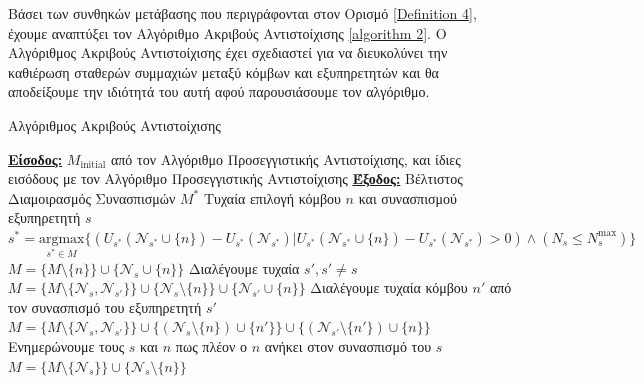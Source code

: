 Βάσει των συνθηκών μετάβασης που περιγράφονται στον Ορισμό \ref{Definition 4}, έχουμε αναπτύξει τον Αλγόριθμο Ακριβούς Αντιστοίχισης \ref{algorithm 2}. Ο Αλγόριθμος Ακριβούς Αντιστοίχισης έχει σχεδιαστεί για να διευκολύνει την καθιέρωση σταθερών συμμαχιών μεταξύ κόμβων και εξυπηρετητών και θα αποδείξουμε την ιδιότητά του αυτή αφού παρουσιάσουμε τον αλγόριθμο.

\begin{algorithm}[h]
\caption{Αλγόριθμος Ακριβούς Αντιστοίχισης} \label{algorithm 2}
\begin{algorithmic}[1]
\STATE \textbf{\underline{Είσοδος:}}
    $M_{\text{initial}}$ από τον Αλγόριθμο Προσεγγιστικής Αντιστοίχισης, και ίδιες εισόδους με τον Αλγόριθμο Προσεγγιστικής Αντιστοίχισης
\STATE \textbf{\underline{Έξοδος:}}
    Βέλτιστος Διαμοιρασμός Συνασπισμών $M^*$
    \REPEAT
        \STATE Τυχαία επιλογή κόμβου $n$ και συνασπισμού εξυπηρετητή $s$
            \STATE $s^* = \underset{s^* \in M}{\text{argmax}} \{ (U_{s^*}(\mathcal{N}_{s^*}\cup\{n\}) - U_{s^*}(\mathcal{N}_{s^*}) | U_{s^*}(\mathcal{N}_{s^*}\cup\{n\}) - U_{s^*}(\mathcal{N}_{s^*}) > 0) \land (N_s \leq N_s^{\max})\}$
            \STATE $M = \{M \setminus\{n\}\} \cup \{\mathcal{N}_s\cup\{n\}\}$
        \ELSE
            \STATE Διαλέγουμε τυχαία  $s', s' \neq s$ 
                    \STATE $M = \{M \setminus\{\mathcal{N}_s,\mathcal{N}_{s{'}}\}\}\cup\{\mathcal{N}_s\setminus\{n\}\}\cup\{\mathcal{N}_{s{'}}\cup\{n\}\}$
                \ENDIF
            \ELSE
                \STATE Διαλέγουμε τυχαία κόμβου $n'$ από τον συνασπισμό του εξυπηρετητή $s'$
                    \STATE $M=\{M\setminus \{\mathcal{N}_s,\mathcal{N}_{s'}\}\} \cup \{(\mathcal{N}_s \setminus \{n\}) \cup \{n'\}\} \cup \{(\mathcal{N}_{s'} \setminus\{n'\}) \cup \{n\}\}$
                \ENDIF
            \ENDIF
        \ENDIF
        \STATE Ενημερώνουμε τους $s$ και $n$ πως πλέον ο $n$ ανήκει στον συνασπισμό του $s$
            \STATE $M = \{M \setminus \{\mathcal{N}_s\}\} \cup \{\mathcal{N}_s\setminus\{n\}\}$
        \ENDIF
\end{algorithmic}
\end{algorithm}


